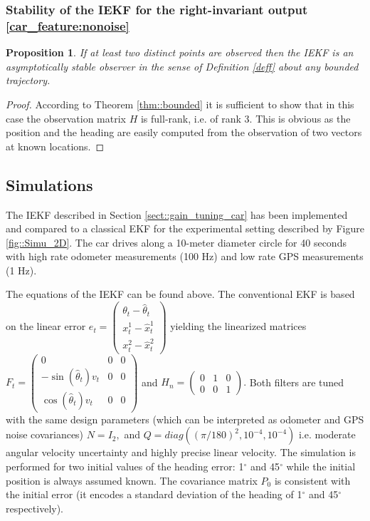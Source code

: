 \documentclass[a4paper,12pt,onecolumn]{article}
\newtheorem{prop}{Proposition}
\begin{document}
 \subsubsection{Stability of the IEKF for the right-invariant output \eqref{car_feature:nonoise}}




\begin{prop}
If at least two distinct points are observed then the IEKF is an asymptotically stable observer in the sense of Definition \ref{deff} about \emph{any} bounded trajectory.
\end{prop}

\begin{proof}
According to Theorem \ref{thm::bounded} it is sufficient to show that in this case the observation matrix $H$ is full-rank, i.e. of rank 3. This is obvious as the position and the heading are easily computed from the observation of two vectors at known locations.
\end{proof}

\subsection{Simulations}

The IEKF described in Section \ref{sect::gain_tuning_car} has been implemented and compared to a classical EKF for the experimental setting described by Figure \ref{fig::Simu_2D}. The car drives along a 10-meter diameter circle  for 40 seconds with high rate odometer measurements (100 Hz) and low rate GPS measurements (1 Hz). 

The equations of the IEKF can be found above. The conventional  EKF  is based on the linear error $e_t=\begin{pmatrix} \theta_t - \hat \theta_t \\  x_t^1 - \hat x_t^1 \\ x_t^2 -\hat x_t^2 \end{pmatrix}$ yielding the linearized matrices  $
F_t = \begin{pmatrix}
0 & 0 & 0 \\
-\sin(\hat \theta_t) v_t & 0 & 0 \\
\cos(\hat \theta_t) v_t & 0 & 0
\end{pmatrix} $ and $
H_n = 
\begin{pmatrix}
0 & 1 & 0 \\
0 & 0 & 1 
\end{pmatrix}.
$
 Both filters are tuned with the same design parameters (which can be interpreted as odometer and GPS noise covariances) $
N = I_2,$ and $Q=diag( (\pi/180)^2,10^{-4} ,10^{-4})$ i.e. moderate angular velocity uncertainty and highly precise linear velocity. 
The simulation is performed for two initial values of the heading error: 1$^{\circ}$ and 45$^{\circ}$ while the initial position is always assumed known. The covariance matrix $P_0$ is consistent with the initial error (it encodes a standard deviation of the heading of 1$^{\circ}$ and 45$^{\circ}$ respectively).
\end{document}
